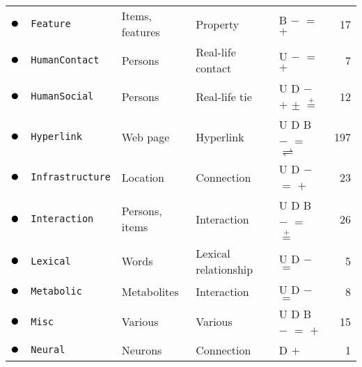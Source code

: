 \begin{tabular}{lllllr}
\textcolor{colorFeature}{$\newmoon$} &\texttt{Feature} & Items, features & Property & \phantom{U} \phantom{D} B $-$ $=$ $+$ \phantom{$\pm$} \phantom{$\stackrel{+}{=}$} \phantom{$*$} \phantom{$_*{}^*$} \phantom{$\rightleftharpoons$} \phantom{$++$}  &  17\\
\textcolor{colorHumanContact}{$\newmoon$} &\texttt{HumanContact} & Persons & Real-life contact & U \phantom{D} \phantom{B} $-$ $=$ $+$ \phantom{$\pm$} \phantom{$\stackrel{+}{=}$} \phantom{$*$} \phantom{$_*{}^*$} \phantom{$\rightleftharpoons$} \phantom{$++$}  &  7\\
\textcolor{colorHumanSocial}{$\newmoon$} &\texttt{HumanSocial} & Persons & Real-life tie & U D \phantom{B} $-$ \phantom{$=$} $+$ $\pm$ $\stackrel{+}{=}$ \phantom{$*$} \phantom{$_*{}^*$} \phantom{$\rightleftharpoons$} \phantom{$++$}  &  12\\
\textcolor{colorHyperlink}{$\newmoon$} &\texttt{Hyperlink} & Web page & Hyperlink & U D B $-$ $=$ \phantom{$+$} \phantom{$\pm$} \phantom{$\stackrel{+}{=}$} \phantom{$*$} \phantom{$_*{}^*$} $\rightleftharpoons$ \phantom{$++$}  &  197\\
\textcolor{colorInfrastructure}{$\newmoon$} &\texttt{Infrastructure} & Location & Connection & U D \phantom{B} $-$ $=$ $+$ \phantom{$\pm$} \phantom{$\stackrel{+}{=}$} \phantom{$*$} \phantom{$_*{}^*$} \phantom{$\rightleftharpoons$} \phantom{$++$}  &  23\\
\textcolor{colorInteraction}{$\newmoon$} &\texttt{Interaction} & Persons, items & Interaction & U D B $-$ $=$ \phantom{$+$} \phantom{$\pm$} $\stackrel{+}{=}$ \phantom{$*$} \phantom{$_*{}^*$} \phantom{$\rightleftharpoons$} \phantom{$++$}  &  26\\
\textcolor{colorLexical}{$\newmoon$} &\texttt{Lexical} & Words & Lexical relationship & U D \phantom{B} $-$ $=$ \phantom{$+$} \phantom{$\pm$} \phantom{$\stackrel{+}{=}$} \phantom{$*$} \phantom{$_*{}^*$} \phantom{$\rightleftharpoons$} \phantom{$++$}  &  5\\
\textcolor{colorMetabolic}{$\newmoon$} &\texttt{Metabolic} & Metabolites & Interaction & U D \phantom{B} $-$ $=$ \phantom{$+$} \phantom{$\pm$} \phantom{$\stackrel{+}{=}$} \phantom{$*$} \phantom{$_*{}^*$} \phantom{$\rightleftharpoons$} \phantom{$++$}  &  8\\
\textcolor{colorMisc}{$\newmoon$} &\texttt{Misc} & Various & Various & U D B $-$ $=$ $+$ \phantom{$\pm$} \phantom{$\stackrel{+}{=}$} \phantom{$*$} \phantom{$_*{}^*$} \phantom{$\rightleftharpoons$} \phantom{$++$}  &  15\\
\textcolor{colorNeural}{$\newmoon$} &\texttt{Neural} & Neurons & Connection & \phantom{U} D \phantom{B} \phantom{$-$} \phantom{$=$} $+$ \phantom{$\pm$} \phantom{$\stackrel{+}{=}$} \phantom{$*$} \phantom{$_*{}^*$} \phantom{$\rightleftharpoons$} \phantom{$++$}  &  1\\

\end{tabular}
